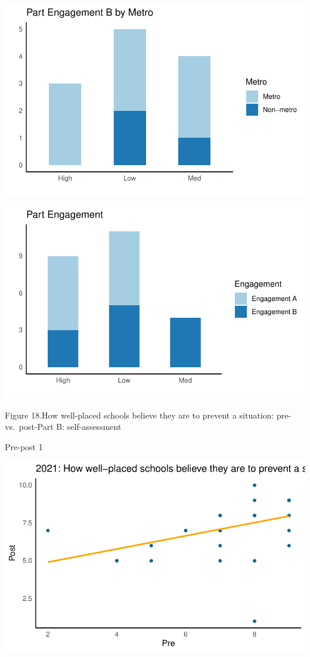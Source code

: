 \documentclass[
  letterpaper,
  DIV=11,
  numbers=noendperiod]{scrartcl}
\begin{document}
\includegraphics{report_files/figure-pdf/unnamed-chunk-19-12.pdf}

\includegraphics{report_files/figure-pdf/unnamed-chunk-19-13.pdf}

Figure 18.How well-placed schools believe they are to prevent a
situation: pre- vs.~post-Part B: self-assessment

Pre-post 1

\includegraphics{report_files/figure-pdf/unnamed-chunk-20-1.pdf}
\end{document}
